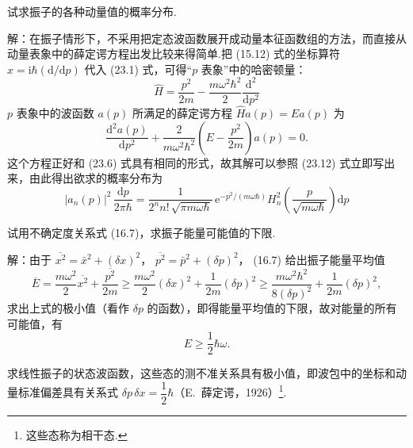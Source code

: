 \begin{xiti}

\quad 试求振子的各种动量值的概率分布.

解：在振子情形下，不采用把定态波函数展开成动量本征函数组的方法，而直接从动量表象中的薛定谔方程出发比较来得简单.把 (15.12) 式的坐标算符
$\hat{x}=\mathrm{i}\hbar\left(\mathrm{d}/\mathrm{d}p\right)$
代入 (23.1) 式，可得“$p$ 表象”中的哈密顿量：
\begin{equation*}
  \hat{H}=\frac{p^2}{2m}
  -\frac{m\omega^2\hbar^2}{2}\frac{\mathrm{d}^2}{\mathrm{d}p^2}
\end{equation*}
$p$ 表象中的波函数 $a(p)$ 所满足的薛定谔方程 $\hat{H}a(p)=Ea(p)$ 为
\begin{equation*}
  \frac{\mathrm{d}^2 a(p)}{\mathrm{d}p^2}
  +\frac{2}{m\omega^2\hbar^2}
  \left(E-\frac{p^2}{2m}\right)a(p)=0.
\end{equation*}
这个方程正好和 (23.6) 式具有相同的形式，故其解可以参照 (23.12) 式立即写出来，由此得出欲求的概率分布为
\begin{equation*}
  |a_n(p)|^2\,\frac{\mathrm{d}p}{2\pi\hbar}
  =\frac{1}{2^n n!\,\sqrt{\pi m\omega\hbar}}\,
  \mathrm{e}^{-p^2/(m\omega\hbar)}
  H_n^2\left(\frac{p}{\sqrt{m\omega\hbar}}\right)\mathrm{d}p
\end{equation*}

\quad 试用不确定度关系式 (16.7)，求振子能量可能值的下限.

解：由于 $\overline{x^2}=\bar{x}^2+\left(\delta x\right)^2$，
$\overline{p^2}=\bar{p}^2+\left(\delta p\right)^2$，
(16.7) 给出振子能量平均值
\begin{equation*}
  \overline{E}=\frac{m\omega^2}{2}\overline{x^2}
  +\frac{\overline{p^2}}{2m}
  \geqslant\frac{m\omega^2}{2}\left(\delta x\right)^2
  +\frac{1}{2m}\left(\delta p\right)^2
  \geqslant\frac{m\omega^2\hbar^2}{8\left(\delta p\right)^2}
  +\frac{1}{2m}\left(\delta p\right)^2,
\end{equation*}
求出上式的极小值（看作 $\delta p$ 的函数），即得能量平均值的下限，故对能量的所有可能值，有
\begin{equation*}
  E\geqslant\frac{1}{2}\hbar\omega.
\end{equation*}

\quad 求线性振子的状态波函数，这些态的测不准关系具有极小值，即波包中的坐标和动量标准偏差具有关系式
$\delta p\,\delta x=\dfrac{1}{2}\hbar$（E.~薛定谔，1926）\footnote{这些态称为相干态.}.


\end{xiti}
